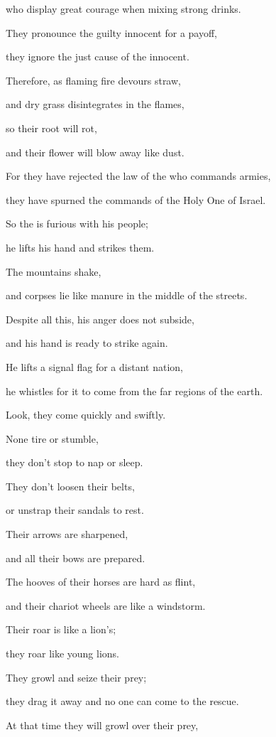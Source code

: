 {\par }{\Q who display
great courage when mixing
strong drinks.
\par }{\Q {}They pronounce the guilty
innocent
for
a payoff,
\par }{\Q they ignore
the just
cause of the innocent.
\par }{\Q {}Therefore,
as flaming
fire
devours
straw,
\par }{\Q and dry grass
disintegrates
in the flames,
\par }{\Q so their root
will rot,
\par }{\Q and their flower
will blow away
like dust.
\par }{\Q For
they have rejected
the
law
of the {}
who commands armies,
\par }{\Q they have spurned
the
commands
of the Holy One
of Israel.
\par }{\Q {}So
the {}
is furious
with his people;
\par }{\Q he lifts
his hand
and strikes
them.
\par }{\Q The mountains
shake,
\par }{\Q and corpses
lie
like manure
in the middle
of the streets.
\par }{\Q Despite all
this,
his anger
does not
subside,
\par }{\Q and his hand
is ready to strike
again.
\par }{\Q {}He lifts a signal flag
for a distant
nation,
\par }{\Q he whistles
for it to come from the far regions
of the earth.
\par }{\Q Look,
they come
quickly
and swiftly.
\par }{\Q {}None
tire
or stumble,
\par }{\Q they don’t
stop to nap
or sleep.
\par }{\Q They don’t
loosen
their belts,
\par }{\Q or unstrap
their sandals
to rest.
\par }{\Q {}Their arrows
are sharpened,
\par }{\Q and all
their bows
are prepared.
\par }{\Q The hooves
of their horses
are hard as flint,
\par }{\Q and their chariot wheels
are like a windstorm.
\par }{\Q {}Their roar
is like a lion’s;
\par }{\Q they roar
like young lions.
\par }{\Q They growl
and seize
their prey;
\par }{\Q they drag
it away
and no
one can come to the rescue.
\par }{\Q {}At that time
they will growl
over
their prey,

}
